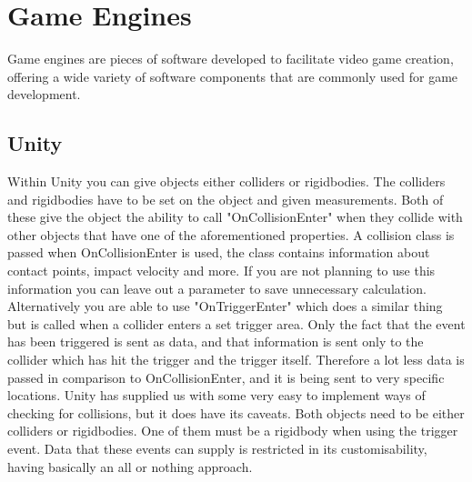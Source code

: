 \documentclass{scrartcl}
\begin{document}
	
	\section{Game Engines}
	Game engines are pieces of software developed to facilitate video game creation, offering a wide variety of software components that are commonly used for game development\cite{polanvcec2017developing}.
	\subsection{Unity}
	Within Unity you can give objects either colliders or rigidbodies. The colliders and rigidbodies have to be set on the object and given measurements. Both of these give the object the ability to call "OnCollisionEnter" when they collide with other objects that have one of the aforementioned properties\cite{UnityCollision}. A collision class is passed when OnCollisionEnter is used, the class contains information about contact points, impact velocity and more. If you are not planning to use this information you can leave out a parameter to save unnecessary calculation\cite{UnityCollision}. Alternatively you are able to use "OnTriggerEnter" which does a similar thing but is called when a collider enters a set trigger area. Only the fact that the event has been triggered is sent as data, and that information is sent only to the collider which has hit the trigger and the trigger itself\cite{UnityTrigger}. Therefore a lot less data is passed in comparison to OnCollisionEnter, and it is being sent to very specific locations. Unity has supplied us with some very easy to implement ways of checking for collisions, but it does have its caveats. Both objects need to be either colliders or rigidbodies. One of them must be a rigidbody when using the trigger event\cite{UnityTrigger}. Data that these events can supply is restricted in its customisability, having basically an all or nothing approach.
	
\end{document}
